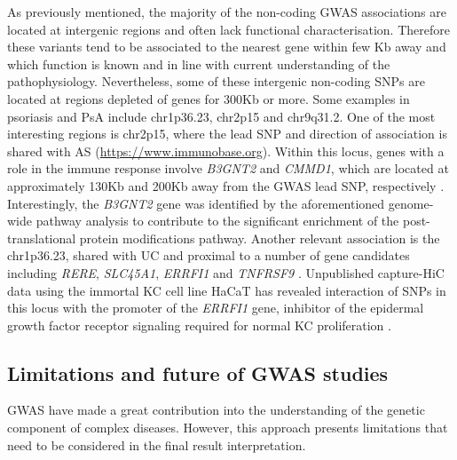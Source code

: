 As previously mentioned, the majority of the non-coding GWAS associations are located at intergenic regions and often lack functional characterisation. Therefore these variants tend to be associated to the nearest gene within few Kb away and which function is known and in line with current understanding of the pathophysiology. Nevertheless, some of these intergenic non-coding SNPs are located at regions depleted of genes for 300Kb or more. Some examples in psoriasis and PsA include chr1p36.23, chr2p15 and chr9q31.2. One of the most interesting regions is chr2p15, where the lead SNP and direction of association is shared with AS (\url{https://www.immunobase.org}). Within this locus, genes with a role in the immune response involve \textit{B3GNT2} and \textit{CMMD1}, which are located at approximately 130Kb and 200Kb away from the GWAS lead SNP, respectively  \parencite{Maine2007, Tsoi2012}. Interestingly, the \textit{B3GNT2} gene was identified by the aforementioned genome-wide pathway analysis to contribute to the significant enrichment of the post-translational protein modifications pathway.
Another relevant association is the chr1p36.23, shared with UC and proximal to a number of gene candidates including \textit{RERE}, \textit{SLC45A1}, \textit{ERRFI1} and \textit{TNFRSF9} \parencite{Tsoi2012}. Unpublished capture-HiC data using the immortal KC cell line  HaCaT has revealed interaction of SNPs in this locus with the promoter of the \textit{ERRFI1} gene, inhibitor of the epidermal growth factor receptor signaling required for normal KC proliferation \parencite{Ray-Jones2017}. %

 

  

\subsection{Limitations and future of GWAS studies}

GWAS have made a great contribution into the understanding of the genetic component of complex diseases. However, this approach presents limitations that need to be considered in the final result interpretation. 

